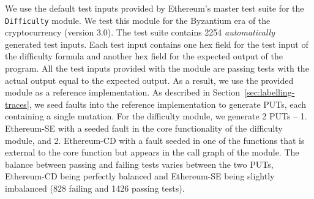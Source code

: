 We use the default test inputs provided by Ethereum's master test suite for the \texttt{Difficulty} module. We test this module for the Byzantium era of the cryptocurrency (version 3.0). The test suite contains 2254 \emph{automatically} generated test inputs. Each test input contains one hex field for the test input of the difficulty formula and another hex field for the expected output of the program. All the test inputs provided with the module are passing tests with the actual output equal to the expected output. As a result, we use the provided module as a reference implementation. As described in Section~\ref{sec:labelling-traces}, we seed faults into the reference implementation to generate PUTs, each containing a single mutation. For the difficulty module, we generate 2 PUTs -- 1. Ethereum-SE with a seeded fault in the core functionality of the difficulty module, and 2. Ethereum-CD  with a fault seeded in one of the functions that is external to the core function but appears in the call graph of the module.  The balance between passing and failing tests varies between the two PUTs, Ethereum-CD being perfectly balanced and Ethereum-SE being slightly imbalanced (828 failing and 1426 passing tests). %
\iffalse
by mutating passing test inputs and checking if they cause the actual output to differ from the expected output. Inputs and code mutations that result in the actual and expected output to differ are used as failing traces.  We apply the following common types of mutations~\cite{jia2011analysis, pradel2018deepbugs} that are most applicable to the module code structure and syntax: 
\begin{enumerate}
	\item Logical connector replacement applied to \{$\&\&, ||, !$\}.
	\item Relational operator replacement applied to \\ \{$<, > , ==, <=, >=, !=$\}.
	\item Argument swapping in function calls.
	\item Scalar variable replacement.
	\item Loop boundary value replacement.
\end{enumerate}
In the experiments that evaluate the classification model, we ensure that the expected output is removed from the traces, along with any information and assertions in the code that compare it with the actual output.  
\fi

